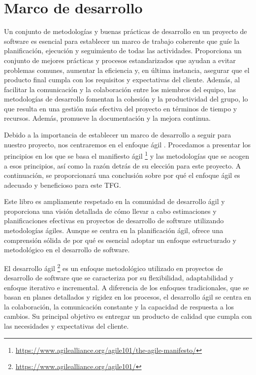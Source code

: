 \section{Marco de desarrollo}

Un conjunto de metodologías y buenas prácticas de desarrollo en un proyecto de software es esencial 
para establecer un marco de trabajo coherente que guíe la planificación, ejecución y seguimiento de 
todas las actividades. Proporciona un conjunto de mejores prácticas y procesos estandarizados que 
ayudan a evitar problemas comunes, aumentar la eficiencia y, en última instancia, asegurar que el 
producto final cumpla con los requisitos y expectativas del cliente. Además, al facilitar la 
comunicación y la colaboración entre los miembros del equipo, las metodologías de desarrollo fomentan 
la cohesión y la productividad del grupo, lo que resulta en una gestión más efectiva del proyecto en 
términos de tiempo y recursos. Además, promueve la documentación y la mejora continua.

Debido a la importancia de establecer un marco de desarrollo a seguir para nuestro proyecto, nos 
centraremos en el enfoque ágil \cite{WhyAgile}. Procedamos a presentar los principios en los que se 
basa el manifiesto ágil \footnote{\url{https://www.agilealliance.org/agile101/the-agile-manifesto/}} y 
las metodologías que se acogen a esos principios, así como la razón detrás de su elección para este 
proyecto. A continuación, se proporcionará una conclusión sobre por qué el enfoque ágil es adecuado y 
beneficioso para este TFG.

Este libro\cite{MetodDesa} es ampliamente respetado en la comunidad de desarrollo ágil y proporciona 
una visión detallada de cómo llevar a cabo estimaciones y planificaciones efectivas en proyectos de 
desarrollo de software utilizando metodologías ágiles. Aunque se centra en la planificación ágil, 
ofrece una comprensión sólida de por qué es esencial adoptar un enfoque estructurado y metodológico en 
el desarrollo de software.

El desarrollo ágil \footnote{\url{https://www.agilealliance.org/agile101/}} es un enfoque metodológico 
utilizado en proyectos de desarrollo de software que se caracteriza por su flexibilidad, adaptabilidad 
y enfoque iterativo e incremental. A diferencia de los enfoques tradicionales, que se basan en planes 
detallados y rigidez en los procesos, el desarrollo ágil se centra en la colaboración, la comunicación 
constante y la capacidad de respuesta a los cambios. Su principal objetivo es entregar un producto de 
calidad que cumpla con las necesidades y expectativas del cliente.

